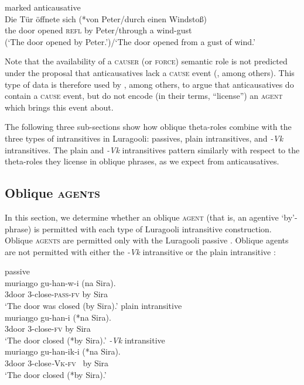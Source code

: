 \documentclass[output=paper]{langsci/langscibook}
\begin{document}
\ex\label{ex:gluckman:6c}
{{marked anticausative}}\\
\gll   Die Tür   öffnete sich (*von Peter/durch einen Windstoß)\\
       the door opened \textsc{refl}  by   Peter/through a wind-gust\\
\glt (‘The door opened by Peter.’)/‘The door opened from a gust of wind.’
\z
\z

Note that the availability of a \textsc{causer} (or \textsc{force}) semantic role is not predicted under the proposal that anticausatives lack a\textsc{ cause} event (\citealt{Haspelmath1993}, among others). This type of data is therefore used by \citet{Schäfer2008}, among others, to argue that anticausatives do contain a \textsc{cause} event, but do not encode (in their terms, “license”) an \textsc{agent} which brings this event about. 

The following three sub-sections show how oblique theta-roles combine with the three types of intransitives in Luragooli: passives, plain intransitives, and \textit{-Vk} intransitives. The plain and \textit{-Vk} intransitives pattern similarly with respect to the theta-roles they license in oblique phrases, as we expect from anticausatives.

\subsection{Oblique \textsc{agents}} 

In this section, we determine whether an oblique \textsc{agent} (that is, an agentive ‘by’-phrase) is permitted with each type of Luragooli intransitive construction. Oblique \textsc{agents} are permitted only with the Luragooli passive . Oblique agents are not permitted with either the \textit{-Vk} intransitive  or the plain intransitive :

\ea\label{ex:gluckman:7} 
  \ea\label{ex:gluckman:7a} 
  {{passive}}\\
  \gll muriaŋgo gu-han-w-i            (na Sira).\\
      3door       3-close-\textsc{pass}-\textsc{fv}    by  Sira\\
  \glt ‘The door was closed (by Sira).’
  \ex\label{ex:gluckman:7b} 
  {{ plain intransitive}}\\
  \gll muriaŋgo gu-han-i   (*na Sira).\\
      3door      3-close-\textsc{fv}   by   Sira\\
  \glt ‘The door closed (*by Sira).’
  \ex\label{ex:gluckman:7c} 
  {{\textit{-Vk}}{ intransitive}}\\
  \gll muriaŋgo gu-han-ik-i     (*na Sira).\\
      3door       3-close\textit{-}\textsc{Vk}-\textsc{fv}~ by  Sira\\
  \glt     ‘The door closed (*by Sira).’\\
  \z
\z
     
\end{document}
